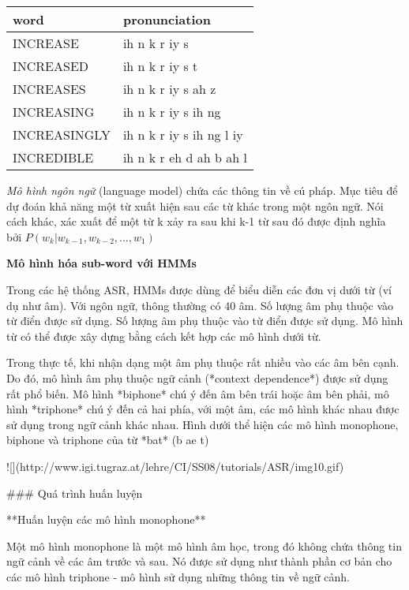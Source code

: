 
\begin{tabular}{ | l | l | }
  \hline
  word & pronunciation \\ \hline
  INCREASE & ih n k r iy s \\ \hline
  INCREASED & ih n k r iy s t \\ \hline
  INCREASES & ih n k r iy s ah z \\ \hline
  INCREASING & ih n k r iy s ih ng  \\ \hline
  INCREASINGLY & ih n k r iy s ih ng l iy \\ \hline
  INCREDIBLE & ih n k r eh d ah b ah l \\ \hline
\end{tabular}

\textit{Mô hình ngôn ngữ} (language model) chứa các thông tin về cú pháp. Mục tiêu để dự đoán khả năng một từ xuất hiện sau các từ khác trong một ngôn ngữ. Nói cách khác, xác xuất để một từ k xảy ra sau khi k-1 từ sau đó được định nghĩa bởi $P(w_k | w_{k-1}, w_{k-2}, ..., w_1)$

\textbf{Mô hình hóa sub-word với HMMs}

Trong các hệ thống ASR, HMMs được dùng để biểu diễn các đơn vị dưới từ (ví dụ như âm). Với ngôn ngữ, thông thường có 40 âm. Số lượng âm phụ thuộc vào từ điển được sử dụng. Số lượng âm phụ thuộc vào từ điển được sử dụng. Mô hình từ có thể được xây dựng bằng cách kết hợp các mô hình dưới từ.

Trong thực tế, khi nhận dạng một âm phụ thuộc rất nhiều vào các âm bên cạnh. Do đó, mô hình âm phụ thuộc ngữ cảnh (*context dependence*) được sử dụng rất phổ biến. Mô hình *biphone* chú ý đến âm bên trái hoặc âm bên phải, mô hình *triphone* chú ý đến cả hai phía, với một âm, các mô hình khác nhau được sử dụng trong ngữ cảnh khác nhau. Hình dưới thể hiện các mô hình monophone, biphone và triphone của từ *bat* (b ae t)

![](http://www.igi.tugraz.at/lehre/CI/SS08/tutorials/ASR/img10.gif)

### Quá trình huấn luyện

**Huấn luyện các mô hình monophone**

Một mô hình monophone là một mô hình âm học, trong đó không chứa thông tin ngữ cảnh về các âm trước và sau. Nó được sử dụng như thành phần cơ bản cho các mô hình triphone - mô hình sử dụng những thông tin về ngữ cảnh.

